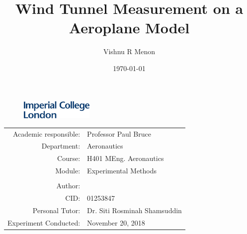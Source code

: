 \begin{figure}
  \includegraphics[width=3.5cm]{icl_logo.jpg}
\end{figure}

\title{Wind Tunnel Measurement on a Aeroplane Model}
\date{\today}
\maketitle
\begin{center}
\begin{tabular}{r l}
Academic responsible: & Professor Paul Bruce \\
Department: & Aeronautics \\
Course: & H401 MEng. Aeronautics \\
Module: & Experimental Methods \\
\\
Author: & \author{Vishnu R Menon}  \\
CID: & 01253847 \\
Personal Tutor: & Dr. Siti Rosminah Shamsuddin \\
Experiment Conducted: & November 20, 2018 \\
\end{tabular}
\end{center}
\vspace*{5cm}

\newpage